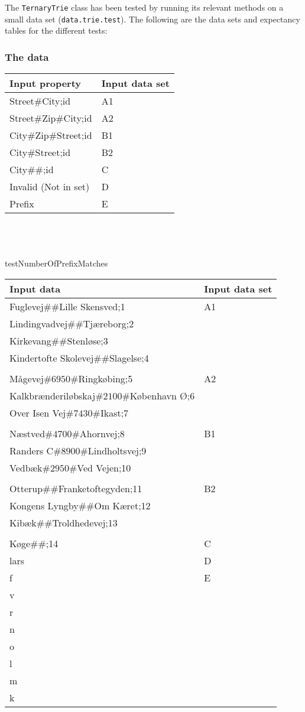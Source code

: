 The \texttt{TernaryTrie} class has been tested by running its relevant methods on a small data set (\texttt{data.trie.test}). The following are the data sets and expectancy tables for the different tests:

\subsubsection{The data}
\begin{tabular}{ p{8cm} | p{2cm} }
	\textbf{Input property} & \textbf{Input data set} \\	
	\hline
	Street$\#$City;id & A1 \\
	Street$\#$Zip$\#$City;id & A2 \\
	City$\#$Zip$\#$Street;id & B1 \\
	City$\#$Street;id &  B2 \\
	City$\#\#$;id & C \\
	Invalid (Not in set) & D \\
	Prefix & E \\
\end{tabular}
\\
\\
\\testNumberOfPrefixMatches
\begin{tabular}{ p{8cm} | p{2cm} }
\textbf{Input data} & \textbf{Input data set} \\
	\hline
	Fuglevej$\#\#$Lille Skensved;1 & A1 \\
	Lindingvadvej$\#\#$Tj\ae reborg;2 \\
	Kirkevang$\#\#$Stenl\o se;3 \\
	Kindertofte Skolevej$\#\#$Slagelse;4 \\
	\\
	M\aa gevej$\#6950\#$Ringk\o bing;5 & A2 \\
	Kalkbr\ae nderil\o bskaj$\#2100\#$K\o benhavn \O ;6 \\
	Over Isen Vej$\#7430\#$Ikast;7 \\
	\\
	N\ae stved$\#4700\#$Ahornvej;8 & B1 \\
	Randers C$\#8900\#$Lindholtsvej;9 \\
	Vedb\ae k$\#2950\#$Ved Vejen;10 \\
	\\
	Otterup$\#\#$Franketoftegyden;11 & B2 \\
	Kongens Lyngby$\#\#$Om K\ae ret;12 \\
	Kib\ae k$\#\#$Troldhedevej;13 \\
	\\
	K\o ge$\#\#$;14 & C \\
	lars & D \\
	f & E \\
	v &   \\
	r &   \\
	n &   \\
	o &   \\
	l &   \\
	m &   \\
	k &   \\
\end{tabular}

